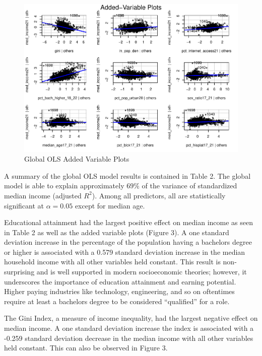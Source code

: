 \documentclass[
]{article}
\begin{document}
\begin{figure}[H]

{\centering \includegraphics[width=1\linewidth]{final-project-write-up-nathan-nguyen_files/figure-latex/unnamed-chunk-6-1} 

}

\caption{Global OLS Added Variable Plots}\label{fig:unnamed-chunk-6}
\end{figure}

A summary of the global OLS model results is contained in Table 2. The
global model is able to explain approximately \(69\%\) of the variance
of standardized median income (adjusted \(R^{2}\)). Among all
predictors, all are statistically significant at \(\alpha = 0.05\)
except for median age.

Educational attainment had the largest positive effect on median income
as seen in Table 2 as well as the added variable plots (Figure 3). A one
standard deviation increase in the percentage of the population having a
bachelors degree or higher is associated with a 0.579 standard deviation
increase in the median household income with all other variables held
constant. This result is non-surprising and is well supported in modern
socioeconomic theories; however, it underscores the importance of
education attainment and earning potential. Higher paying industries
like technology, engineering, and so on oftentimes require at least a
bachelors degree to be considered ``qualified'' for a role.

The Gini Index, a measure of income inequality, had the largest negative
effect on median income. A one standard deviation increase the index is
associated with a -0.259 standard deviation decrease in the median
income with all other variables held constant. This can also be observed
in Figure 3.
\end{document}
